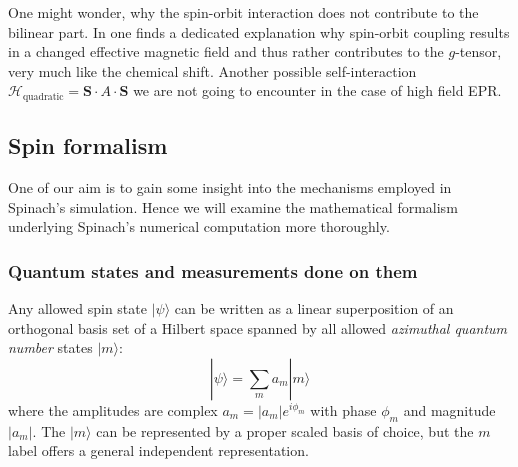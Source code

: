 \documentclass[11.5pt,a4paper]{article}
\begin{document}
  One might wonder, why the spin-orbit interaction does not contribute to the bilinear part. In \cite[chap 11.2, p. 505ff]{slichter} one finds a dedicated explanation why spin-orbit coupling results in a changed effective magnetic field and thus rather contributes to the $g$-tensor, very much like the chemical shift.
  Another possible self-interaction $\mathcal{H}_\text{quadratic} = \mathbf{S} \cdot A \cdot \mathbf{S}$ we are not going to encounter in the case of high field EPR.

\subsection{Spin formalism}
One of our aim is to gain some insight into the mechanisms employed in Spinach's simulation. Hence we will examine the mathematical formalism  underlying Spinach's numerical computation more thoroughly.

\subsubsection{Quantum states and measurements done on them}
Any allowed spin state $| \psi \rangle$ can be written as a linear superposition of an orthogonal basis set of a Hilbert  space spanned by all allowed \emph{azimuthal quantum number} states $| m \rangle$:
\begin{equation}
 | \psi \rangle = \sum_m a_m | m \rangle 
\label{eq-orthonormal-basis}
\end{equation}
where the amplitudes are complex $a_m = |a_m| e^{i\phi_m}$ with phase $\phi_m$ and magnitude $|a_m|$. The $|m\rangle$ can be represented by a proper scaled basis of choice, but the $m$ label offers a general independent representation.
 
\end{document}
